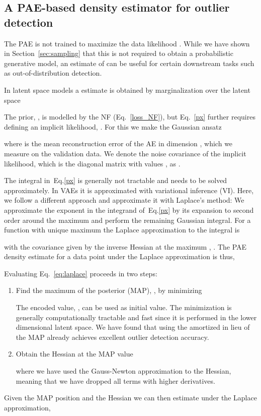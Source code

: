 \documentclass{article}
\begin{document}
\subsection{A PAE-based density estimator for outlier detection}
\label{sec:ood-detector}
The PAE is not trained to maximize the data likelihood . While we have shown in Section~\ref{sec:sampling} that this is not required to obtain a probabilistic generative model, an estimate of  can be useful for certain downstream tasks such as out-of-distribution detection.

In latent space models a  estimate is obtained by marginalization over the latent space

The prior, , is modelled by the NF (Eq.~\ref{loss_NF}), but Eq.~\ref{px} further requires defining an implicit likelihood, .
For this we make the Gaussian ansatz

where  is the mean reconstruction error of the AE in dimension , which we measure on the validation data. We denote the noise covariance of the implicit likelihood, which is the diagonal matrix with values , as . 


The integral in~Eq.\ref{px} is generally not tractable and needs to be solved approximately. In VAEs it is approximated with variational inference (VI). Here, we follow a different approach and approximate it with Laplace's method: We approximate the exponent in the integrand of~Eq.\ref{px} by its expansion to second order around the maximum and perform the remaining Gaussian integral. For a function  with unique maximum  the Laplace approximation to the integral  is 

with the covariance given by the inverse Hessian at the maximum , .
The PAE density estimate for a data point under the Laplace approximation is thus,

Evaluating Eq.~\ref{eq:laplace} proceeds in two steps:
\begin{enumerate}
\item Find the maximum of the posterior (MAP), , by minimizing

The encoded value, , can be used as initial value. The minimization is generally computationally tractable and fast since it is performed in the lower dimensional latent space. We have found that using the amortized  in lieu of the MAP already achieves excellent outlier detection accuracy. 

\item Obtain the Hessian at the MAP value

where we have used the Gauss-Newton approximation
to the Hessian, meaning that we have dropped all terms with higher derivatives. 
\end{enumerate}
Given the MAP position and the Hessian we can then estimate  under the Laplace approximation,
\end{document}

